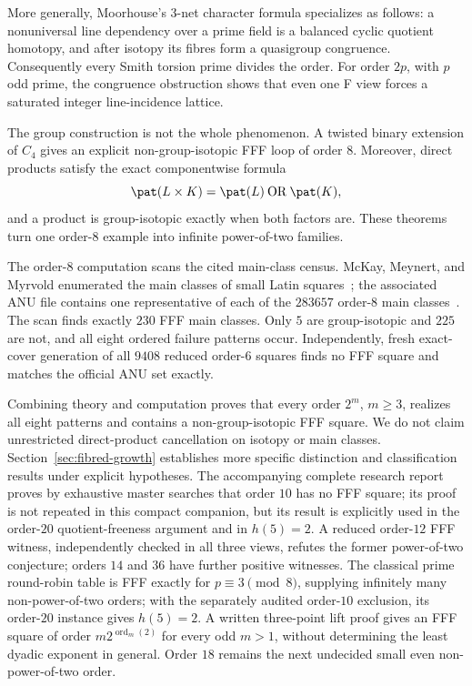 More generally, Moorhouse's $3$-net character formula specializes as follows:
a nonuniversal line dependency over a prime field is a
balanced cyclic quotient homotopy, and after isotopy its fibres form a
quasigroup congruence.  Consequently every Smith torsion prime divides the
order.  For order $2p$, with $p$ odd prime, the congruence obstruction shows
that even one F view forces a saturated integer line-incidence lattice.

The group construction is not the whole phenomenon.  A twisted binary
extension of $C_4$ gives an explicit non-group-isotopic FFF loop of order $8$.
Moreover, direct products satisfy the exact componentwise formula
\[
  \pat(L\times K)=\pat(L)\mathbin{\mathrm{OR}}\pat(K),
\]
and a product is group-isotopic exactly when both factors are.  These theorems
turn one order-$8$ example into infinite power-of-two families.

The order-$8$ computation scans the cited main-class census.  McKay,
Meynert, and Myrvold enumerated the main classes of small Latin
squares~\cite{McKayMeynertMyrvold2007};
the associated ANU file contains one representative of each of the $283657$
order-$8$ main classes~\cite{McKayLatinData}.  The scan finds exactly $230$
FFF main classes.  Only $5$ are group-isotopic and $225$ are not, and all
eight ordered failure patterns occur.  Independently, fresh exact-cover
generation of all $9408$ reduced order-$6$ squares finds no FFF square and
matches the official ANU set exactly.

Combining theory and computation proves that every order $2^m$, $m\geq3$,
realizes all eight patterns and contains a non-group-isotopic FFF square.  We
do not claim unrestricted direct-product cancellation on isotopy or main
classes. Section~\ref{sec:fibred-growth} establishes more specific
distinction and classification results under explicit hypotheses.
The accompanying
complete research report proves by exhaustive master searches that order $10$
has no FFF square; its proof is not repeated in this compact companion,
but its result is explicitly used in the order-$20$ quotient-freeness
argument and in $h(5)=2$. A reduced order-$12$ FFF witness, independently checked in all three
views, refutes the former power-of-two conjecture; orders $14$ and $36$ have
further positive witnesses. The classical prime round-robin table is FFF
exactly for $p\equiv3\pmod8$, supplying infinitely many non-power-of-two
orders; with the separately audited order-$10$ exclusion, its order-$20$
instance gives $h(5)=2$. A written three-point lift proof gives an FFF
square of order $m2^{\operatorname{ord}_m(2)}$ for every odd $m>1$, without
determining the least dyadic exponent in general.  Order $18$ remains the
next undecided small even non-power-of-two order.

